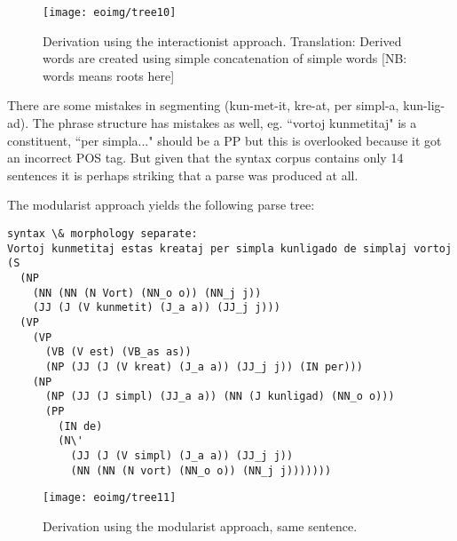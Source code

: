 \documentclass[10pt,a4paper]{article}
\begin{document}
\begin{figure}
\centering
\texttt{[image: eoimg/tree10]}
\caption{Derivation using the interactionist approach. Translation: Derived words are created using simple concatenation of simple words [NB: words means roots here]}
\label{s3}
\end{figure}

There are some mistakes in segmenting (kun-met-it, kre-at, per simpl-a,
kun-lig-ad).  The phrase structure has mistakes as well, eg. ``vortoj
kunmetitaj" is a constituent, ``per simpla..." should be a PP but this is
overlooked because it got an incorrect POS tag. But given that the syntax
corpus contains only 14 sentences it is perhaps striking that a parse was
produced at all.

The modularist approach yields the following parse tree:

\begin{verbatim}
syntax \& morphology separate:
Vortoj kunmetitaj estas kreataj per simpla kunligado de simplaj vortoj 
(S
  (NP
    (NN (NN (N Vort) (NN_o o)) (NN_j j))
    (JJ (J (V kunmetit) (J_a a)) (JJ_j j)))
  (VP
    (VP
      (VB (V est) (VB_as as))
      (NP (JJ (J (V kreat) (J_a a)) (JJ_j j)) (IN per)))
    (NP
      (NP (JJ (J simpl) (JJ_a a)) (NN (J kunligad) (NN_o o)))
      (PP
        (IN de)
        (N\'
          (JJ (J (V simpl) (J_a a)) (JJ_j j))
          (NN (NN (N vort) (NN_o o)) (NN_j j)))))))
\end{verbatim}

\begin{figure}
\texttt{[image: eoimg/tree11]}
\caption{Derivation using the modularist approach, same sentence.}
\label{s4}
\end{figure}
\end{document}
